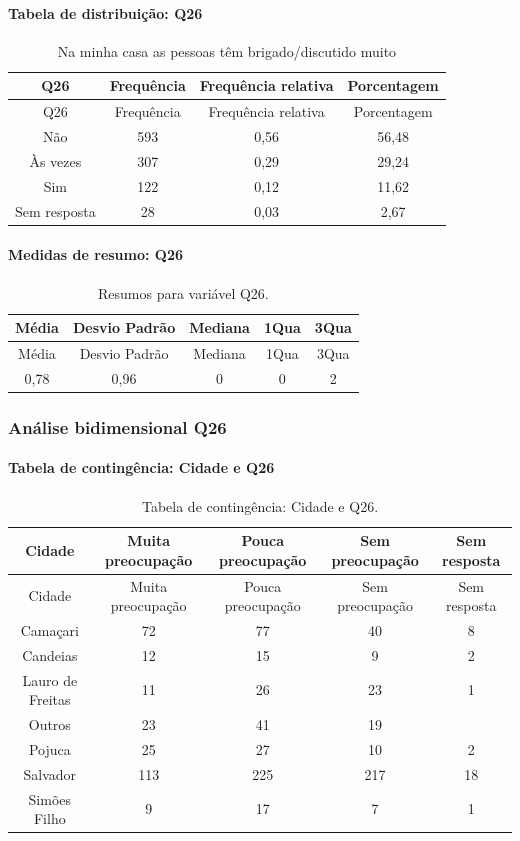 \documentclass[]{article}
\let\oldparagraph\paragraph
\renewcommand{\paragraph}[1]{\oldparagraph{#1}\mbox{}}
\begin{document}
\hypertarget{tabela-de-distribuiuxe7uxe3o-q26}{%
\paragraph{Tabela de distribuição: Q26}\label{tabela-de-distribuiuxe7uxe3o-q26}}

\begin{longtable}[]{@{}cccc@{}}
\caption{\label{tab:unnamed-chunk-719}Na minha casa as pessoas têm brigado/discutido muito}\tabularnewline
\toprule
Q26 & Frequência & Frequência relativa & Porcentagem\tabularnewline
\midrule
\endfirsthead
\toprule
Q26 & Frequência & Frequência relativa & Porcentagem\tabularnewline
\midrule
\endhead
Não & 593 & 0,56 & 56,48\tabularnewline
Às vezes & 307 & 0,29 & 29,24\tabularnewline
Sim & 122 & 0,12 & 11,62\tabularnewline
Sem resposta & 28 & 0,03 & 2,67\tabularnewline
\bottomrule
\end{longtable}

\hypertarget{medidas-de-resumo-q26}{%
\paragraph{Medidas de resumo: Q26}\label{medidas-de-resumo-q26}}

\begin{longtable}[]{@{}ccccc@{}}
\caption{\label{tab:unnamed-chunk-720}Resumos para variável Q26.}\tabularnewline
\toprule
Média & Desvio Padrão & Mediana & 1Qua & 3Qua\tabularnewline
\midrule
\endfirsthead
\toprule
Média & Desvio Padrão & Mediana & 1Qua & 3Qua\tabularnewline
\midrule
\endhead
0,78 & 0,96 & 0 & 0 & 2\tabularnewline
\bottomrule
\end{longtable}

\cleardoublepage

\hypertarget{anuxe1lise-bidimensional-q26}{%
\subsubsection{Análise bidimensional Q26}\label{anuxe1lise-bidimensional-q26}}

\hypertarget{tabela-de-continguxeancia-cidade-e-q26}{%
\paragraph{Tabela de contingência: Cidade e Q26}\label{tabela-de-continguxeancia-cidade-e-q26}}

\begin{longtable}[]{@{}ccccc@{}}
\caption{\label{tab:unnamed-chunk-721}Tabela de contingência: Cidade e Q26.}\tabularnewline
\toprule
Cidade & Muita preocupação & Pouca preocupação & Sem preocupação & Sem resposta\tabularnewline
\midrule
\endfirsthead
\toprule
Cidade & Muita preocupação & Pouca preocupação & Sem preocupação & Sem resposta\tabularnewline
\midrule
\endhead
Camaçari & 72 & 77 & 40 & 8\tabularnewline
Candeias & 12 & 15 & 9 & 2\tabularnewline
Lauro de Freitas & 11 & 26 & 23 & 1\tabularnewline
Outros & 23 & 41 & 19 &\tabularnewline
Pojuca & 25 & 27 & 10 & 2\tabularnewline
Salvador & 113 & 225 & 217 & 18\tabularnewline
Simões Filho & 9 & 17 & 7 & 1\tabularnewline
\bottomrule
\end{longtable}
\end{document}

